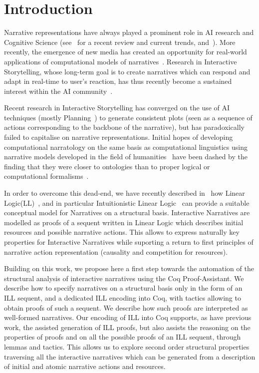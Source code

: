 \documentclass[runningheads,a4paper]{llncs}
\begin{document}
\section{Introduction}
%
Narrative representations have always played a prominent role in AI research and Cognitive Science (see~\cite{Richards09} for a recent review and current trends, and~\cite{AAAI10}). More recently, the emergence of new media has created an opportunity for real-world applications of computational models of narratives~\cite{Laurel93,Murray98}. Research in Interactive Storytelling, whose long-term goal is to create narratives which can respond and adapt in real-time to user's reaction, has thus recently become a sustained interest within the AI community~\cite{AAAI07,AAAI09}.

Recent research in Interactive Storytelling has converged on the use of AI techniques (mostly Planning~\cite{Young99}) to generate consistent plots (seen as a sequence of actions corresponding to the backbone of the narrative), but has paradoxically failed to capitalise on narrative representations. Initial hopes of developing computational narratology on the same basis as computational linguistics using narrative models developed in the field of humanities~\cite{Greimas66,Bremond73} have been dashed by the finding that they were closer to ontologies than to proper logical or computational formalisms~\cite{Cavazza06}.

In order to overcome this dead-end, we have recently described in~\cite{bosser10} how Linear Logic(LL)~\cite{GirardTCS87}, and in particular Intuitionistic Linear Logic~\cite{GirardILL87} can provide a suitable conceptual model for Narratives on a structural basis. Interactive Narratives are modelled as proofs of a sequent written in Linear Logic which describes initial resources and possible narrative actions. This allows to express naturally key properties for Interactive Narratives while suporting a return to first principles of narrative action representation (causality and competition for resources).

Building on this work, we propose here a first step towards the automation of the structural analysis of interactive narratives using the Coq Proof-Assistant. We describe how to specify narratives on a structural basis only in the form of an ILL sequent, and a dedicated ILL encoding into Coq, with tactics allowing to obtain proofs of such a sequent. We describe how such proofs are interpreted as well-formed narratives. Our encoding of ILL into Coq supports, as have previous work, the assisted generation of ILL proofs, but also assists the reasoning on the properties of proofs and on all the possible proofs of an ILL sequent, through lemmas and tactics. This allows us to explore second order structural properties traversing all the interactive narratives which can be generated from a description of initial and atomic narrative actions and resources.
\end{document}
